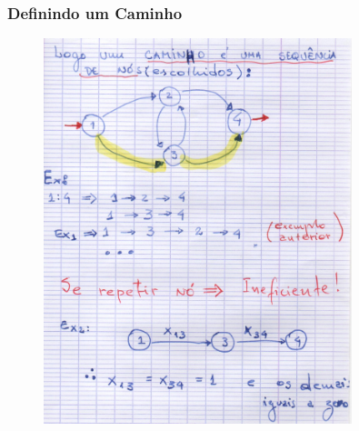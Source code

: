 \documentclass{beamer}
\begin{document}
\begin{frame}
	\frametitle{Definindo um Caminho}
	
	\begin{figure}[tbp]
		\includegraphics[width=0.8\textwidth , height=0.8\textheight]{05_um_caminho.pdf}
		\centering
	\end{figure}
\end{frame}
\end{document}
